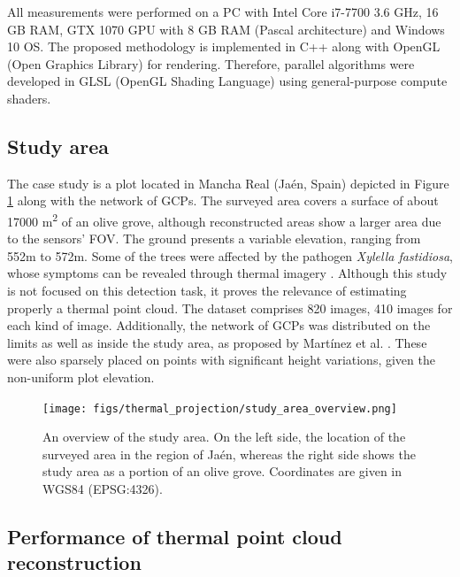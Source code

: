 All measurements were performed on a PC with Intel Core i7-7700 3.6 GHz, 16 GB RAM, GTX 1070 GPU with 8 GB RAM (Pascal architecture) and Windows 10 OS. The proposed methodology is implemented in C++ along with OpenGL (Open Graphics Library) for rendering. Therefore, parallel algorithms were developed in GLSL (OpenGL Shading Language) using general-purpose compute shaders. 

\subsection{Study area}

The case study is a plot located in Mancha Real (Jaén, Spain) depicted in Figure \ref{fig:thermal_study_area} along with the network of GCPs. The surveyed area covers a surface of about 17000 \si{\meter\squared} of an olive grove, although reconstructed areas show a larger area due to the sensors' FOV. The ground presents a variable elevation, ranging from 552\si{\meter} to 572\si{\meter}. Some of the trees were affected by the pathogen \textit{Xylella fastidiosa}, whose symptoms can be revealed through thermal imagery \cite{zarco-tejada_previsual_2018}. Although this study is not focused on this detection task, it proves the relevance of estimating properly a thermal point cloud. The dataset comprises 820 images, 410 images for each kind of image. Additionally, the network of GCPs was distributed on the limits as well as inside the study area, as proposed by Martínez et al. \cite{martinez-carricondo_assessment_2018}. These were also sparsely placed on points with significant height variations, given the non-uniform plot elevation.

\begin{figure}[ht]
    \centering
    \texttt{[image: figs/thermal\_projection/study\_area\_overview.png]}
    \caption{An overview of the study area. On the left side, the location of the surveyed area in the region of Jaén, whereas the right side shows the study area as a portion of an olive grove. Coordinates are given in WGS84 (EPSG:4326). }
	\label{fig:thermal_study_area}
\end{figure}

\subsection{Performance of thermal point cloud reconstruction}

